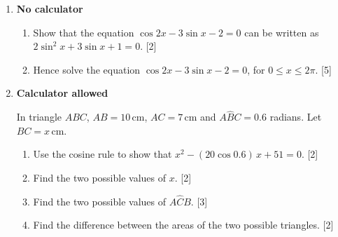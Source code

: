 \documentclass[12pt, twoside]{article}
\begin{document}
\begin{enumerate}[itemsep=0.15cm]
\newpage

\item[3.] [Maximum mark: 7] \hfill \textbf{No calculator}

\begin{enumerate}[itemsep=0.1cm]
  \item Show that the equation $\cos 2x - 3\sin x - 2 = 0$ can be written as
  $2\sin^{2}x + 3\sin x + 1 = 0$. \hfill [2]
  \item Hence solve the equation $\cos 2x - 3\sin x - 2 = 0$, for
  $0 \le x \le 2\pi$. \hfill [5]
\end{enumerate}


\newpage

\item[4.] [Maximum mark: 9] \hfill \textbf{Calculator allowed}

In triangle $ABC$, $AB = 10\,\text{cm}$, $AC = 7\,\text{cm}$ and
$A\hat{B}C = 0.6$ radians. Let $BC = x\,\text{cm}$.

\begin{enumerate}[itemsep=0.1cm]
  \item Use the cosine rule to show that
  $x^{2} - (20\cos 0.6)\,x + 51 = 0$. \hfill [2]
  \item Find the two possible values of $x$. \hfill [2]
  \item Find the two possible values of $A\hat{C}B$. \hfill [3]
  \item Find the difference between the areas of the two possible
  triangles. \hfill [2]
\end{enumerate}



\end{enumerate}
\end{document}
